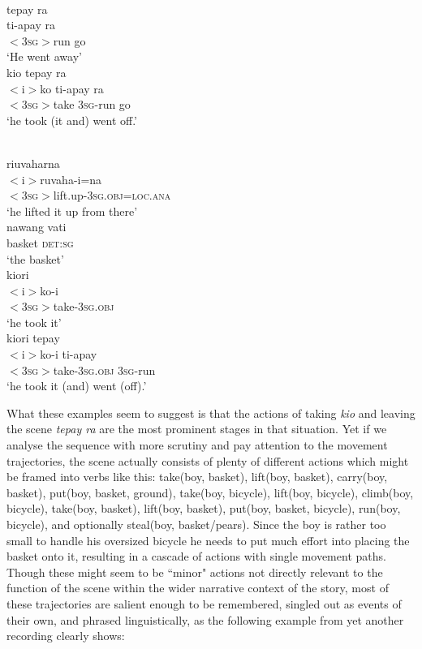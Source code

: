 \ea 
{}\\
\ea
\glll tepay ra \\
ti-apay ra \\
$<$\textsc{3}\textsc{sg}$>$run go \\
\glft `He went away' \\
\ex
\glll kio tepay ra\\
$<$i$>$ko ti-apay ra \\
$<$\textsc{3}\textsc{sg}$>$take \textsc{3}\textsc{sg}-run go\\
\glft `he took (it and) went off.'\\ 
\z
\z

\ea 
{}\\
\ea
\glll riuvaharna \\
$<$i$>$ruvaha-i=na \\
$<$\textsc{3}\textsc{sg}$>$lift.up-\textsc{3}\textsc{sg}.\textsc{obj}=\textsc{loc}.\textsc{ana}\\
\glft `he lifted it up from there'\\
\ex
\gll nawang vati\\
basket \textsc{det}:\textsc{sg} \\
\glft `the basket'\\
\ex
\glll kiori\\
$<$i$>$ko-i \\
$<$\textsc{3}\textsc{sg}$>$take-\textsc{3}\textsc{sg}.\textsc{obj}\\
\glft `he took it'\\
\ex
\glll kiori tepay\\
$<$i$>$ko-i ti-apay \\
$<$\textsc{3}\textsc{sg}$>$take-\textsc{3}\textsc{sg}.\textsc{obj} \textsc{3}\textsc{sg}-run\\
\glft `he took it (and) went (off).' \\
\z
\z

What these examples seem to suggest is that the actions of taking \textit{kio} and leaving the scene \textit{tepay ra} are the most prominent stages in that situation. Yet if we analyse the sequence with more scrutiny and pay attention to the movement trajectories, the scene actually consists of plenty of different actions which might be framed into  verbs like this: take(boy, basket), lift(boy, basket), carry(boy, basket), put(boy, basket, ground), take(boy, bicycle), lift(boy, bicycle), climb(boy, bicycle), take(boy, basket), lift(boy, basket), put(boy, basket, bicycle), run(boy, bicycle), and optionally steal(boy, basket/pears). Since the boy is rather too small to handle his oversized bicycle he needs to put much effort into placing the basket onto it, resulting in a cascade of actions with single movement paths. Though these might seem to be ``minor" actions not directly relevant to the function of the scene within the wider narrative context of the story, most of these trajectories are salient enough to be remembered, singled out as events of their own, and phrased linguistically, as the following example from yet another recording clearly shows:

